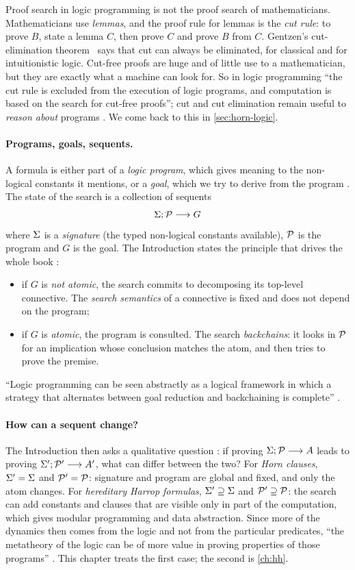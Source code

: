 Proof search in logic programming is not the proof search of mathematicians. Mathematicians use
\emph{lemmas}, and the proof rule for lemmas is the \emph{cut rule}: to prove $B$, state a lemma $C$, then
prove $C$ and prove $B$ from $C$. Gentzen's cut-elimination theorem~\cite{Gentzen1935} says that cut can
always be eliminated, for classical and for intuitionistic logic. Cut-free proofs are huge and of
little use to a mathematician, but they are exactly what a machine can look for. So in logic
programming ``the cut rule is excluded from the execution of logic programs, and computation is based on
the search for cut-free proofs''; cut and cut elimination remain useful to \emph{reason about} programs
. We come back to this in \cref{sec:horn-logic}.

\paragraph{Programs, goals, sequents.} A formula is either part of a \emph{logic program}, which gives
meaning to the non-logical constants it mentions, or a \emph{goal}, which we try to derive from the
program . The state of the search is a collection of sequents
\[
  \Sigma;\mathcal{P}\longrightarrow G
\]
where $\Sigma$ is a \emph{signature} (the typed non-logical constants available), $\mathcal{P}$ is the program and
$G$ is the goal. The Introduction states the principle that drives the whole book :
\begin{itemize}
  \item if $G$ is \emph{not atomic}, the search commits to decomposing its top-level connective. The
    \emph{search semantics} of a connective is fixed and does not depend on the program;
  \item if $G$ is \emph{atomic}, the program is consulted. The search \emph{backchains}: it looks in
    $\mathcal{P}$ for an implication whose conclusion matches the atom, and then tries to prove the premise.
\end{itemize}
``Logic programming can be seen abstractly as a logical framework in which a strategy that alternates
between goal reduction and backchaining is complete'' .

\paragraph{How can a sequent change?} The Introduction then asks a qualitative question : if
proving $\Sigma;\mathcal{P}\longrightarrow A$ leads to proving $\Sigma';\mathcal{P}'\longrightarrow A'$, what can differ between the two?
For \emph{Horn clauses}, $\Sigma'=\Sigma$ and $\mathcal{P}'=\mathcal{P}$: signature and program are global and fixed, and
only the atom changes. For \emph{hereditary Harrop formulas}, $\Sigma'\supseteq\Sigma$ and
$\mathcal{P}'\supseteq\mathcal{P}$: the search can add constants and clauses that are visible only in part of the
computation, which gives modular programming and data abstraction. Since more of the dynamics then
comes from the logic and not from the particular predicates, ``the metatheory of the logic can be of
more value in proving properties of those programs'' . This chapter treats the first case; the
second is \cref{ch:hh}.


